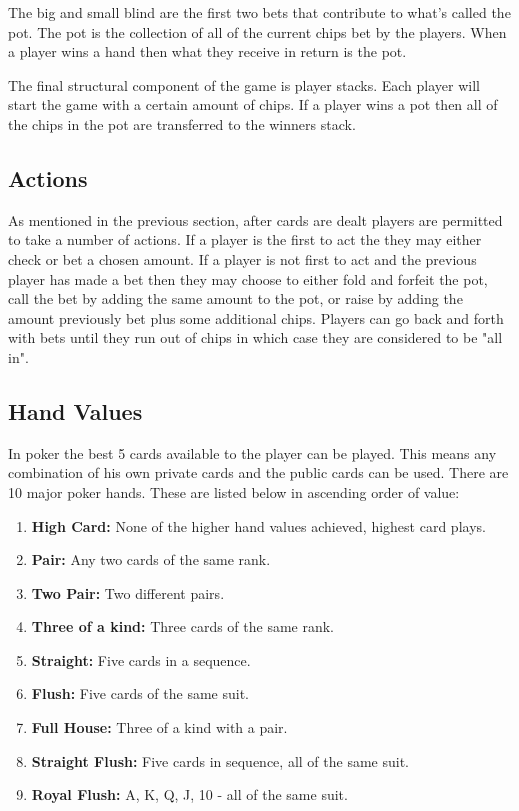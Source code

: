 The big and small blind are the first two bets that contribute to what's called the pot.
The pot is the collection of all of the current chips bet by the players.
When a player wins a hand then what they receive in return is the pot.

The final structural component of the game is player stacks.
Each player will start the game with a certain amount of chips.
If a player wins a pot then all of the chips in the pot are transferred to the winners stack.

\subsection{Actions}\label{subsec:actions}
As mentioned in the previous section, after cards are dealt players are permitted to take a number of actions.
If a player is the first to act the they may either check or bet a chosen amount.
If a player is not first to act and the previous player has made a bet then they may choose
to either fold and forfeit the pot, call the bet by adding the same amount to the pot, or raise by
adding the amount previously bet plus some additional chips.
Players can go back and forth with bets until they run out of chips in which case they are
considered to be "all in".

\subsection{Hand Values}\label{subsec:handValues}
In poker the best 5 cards available to the player can be played.
This means any combination of his own private cards and the public cards can be used.
There are 10 major poker hands.
These are listed below in ascending order of value:
\begin{enumerate}
    \item \textbf{High Card:} None of the higher hand values achieved, highest card plays.
    \item \textbf{Pair:} Any two cards of the same rank.
    \item \textbf{Two Pair:} Two different pairs.
    \item \textbf{Three of a kind:} Three cards of the same rank.
    \item \textbf{Straight:} Five cards in a sequence.
    \item \textbf{Flush:} Five cards of the same suit.
    \item \textbf{Full House:} Three of a kind with a pair.
    \item \textbf{Straight Flush:} Five cards in sequence, all of the same suit.
    \item \textbf{Royal Flush:} A, K, Q, J, 10 - all of the same suit.
\end{enumerate}

